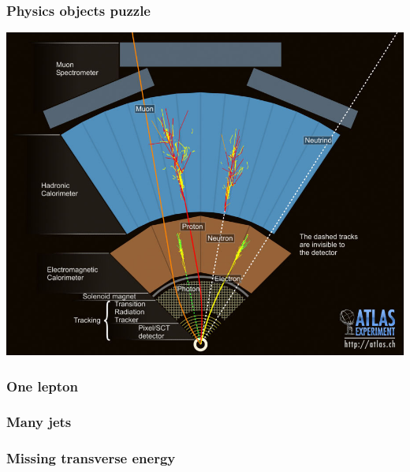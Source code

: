 
\begin{frame}\frametitle{Physics objects puzzle}
\centering\myskip

\includegraphics[height=0.85\textheight, width=1.\textwidth]{../detector/figures/detection}

\end{frame}



\begin{frame}\frametitle{One lepton}
\centering\myskip

\end{frame}



\begin{frame}\frametitle{Many jets}
\centering\myskip

\end{frame}



\begin{frame}\frametitle{Missing transverse energy}
\centering\myskip

\end{frame}

